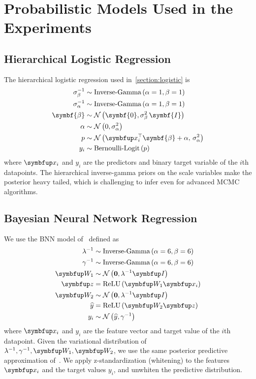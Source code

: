 
\section{Probabilistic Models Used in the Experiments}
\subsection{Hierarchical Logistic Regression}\label{section:linear_logistic}
The hierarchical logistic regression used in~\cref{section:logistic} is 
\begin{align*}
    \sigma_{\beta}^{-1}  &\sim \text{Inverse-Gamma}\left(\alpha=1, \beta=1\right) \\
    \sigma_{\alpha}^{-1} &\sim \text{Inverse-Gamma}\left(\alpha=1, \beta=1\right) \\
    \symbf{\beta} &\sim \mathcal{N}\left(\symbf{0}, \sigma_{\beta}^2\,\symbf{I}\right) \\
    \alpha        &\sim \mathcal{N}\left(0, \sigma_{\alpha}^2\right) \\
    p             &\sim \mathcal{N}\left(\vx_i^{\top}\symbf{\beta} + \alpha,\, \sigma_{\alpha}^2\right)\\
    y_i           &\sim \text{Bernoulli-Logit}\,(p)
\end{align*}
where \(\vx_i\) and \(y_i\) are the predictors and binary target variable of the \(i\)th datapoints.
The hierarchical inverse-gamma priors on the scale variables make the posterior heavy tailed, which is challenging to infer even for advanced MCMC algorithms.

\subsection{Bayesian Neural Network Regression}\label{section:bnn}
We use the BNN model of~\citet{pmlr-v37-hernandez-lobatoc15} defined as
\begin{align*}
  \lambda^{-1} &\sim \text{Inverse-Gamma}\left(\alpha=6, \beta=6\right) \\
  \gamma^{-1}  &\sim \text{Inverse-Gamma}\left(\alpha=6, \beta=6\right) \\
  \mW_1       &\sim \mathcal{N}\left(\mathbf{0}, \lambda^{-1} \mI \right) \\
  \vz         &= \mathrm{ReLU}\left(\mW_1 \vx_i\right) \\
  \mW_2       &\sim \mathcal{N}\left(\mathbf{0}, \lambda^{-1} \mI \right) \\
  \widehat{y} &= \mathrm{ReLU}\left(\mW_2 \vz\right) \\
  y_i         &\sim \mathcal{N}\left(\widehat{y}, \gamma^{-1}\right)
\end{align*}
where \(\vx_i\) and \(y_i\) are the feature vector and target value of the \(i\)th datapoint.
Given the variational distribution of \(\lambda^{-1}, \gamma^{-1}, \mW_1, \mW_2\), we use the same posterior predictive approximation of~\citet{pmlr-v37-hernandez-lobatoc15}.
We apply z-standardization (whitening) to the features \(\vx_i\) and the target values \(y_i\), and unwhiten the predictive distribution.

